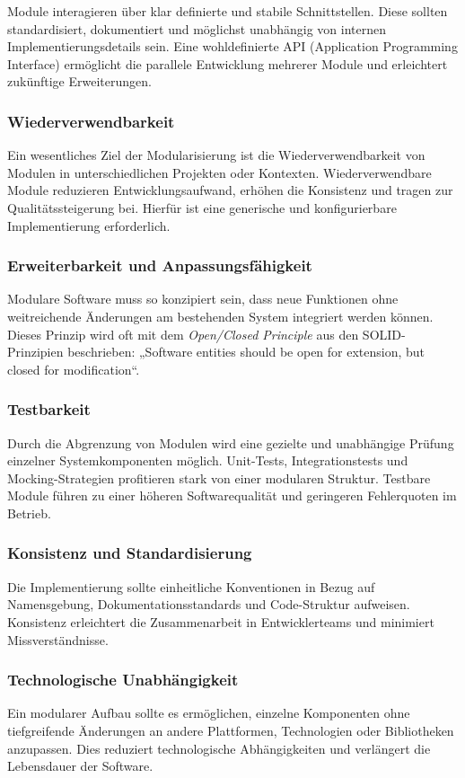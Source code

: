 Module interagieren über klar definierte und stabile Schnittstellen.
Diese sollten standardisiert, dokumentiert und möglichst unabhängig von internen Implementierungsdetails sein.
Eine wohldefinierte API (Application Programming Interface) ermöglicht die parallele Entwicklung mehrerer Module und erleichtert zukünftige Erweiterungen.


\subsubsection{Wiederverwendbarkeit}

Ein wesentliches Ziel der Modularisierung ist die Wiederverwendbarkeit von Modulen in unterschiedlichen Projekten oder Kontexten.
Wiederverwendbare Module reduzieren Entwicklungsaufwand, erhöhen die Konsistenz und tragen zur Qualitätssteigerung bei.
Hierfür ist eine generische und konfigurierbare Implementierung erforderlich.


\subsubsection{Erweiterbarkeit und Anpassungsfähigkeit}

Modulare Software muss so konzipiert sein, dass neue Funktionen ohne weitreichende Änderungen am bestehenden System integriert werden können.
Dieses Prinzip wird oft mit dem \textit{Open/Closed Principle} aus den SOLID-Prinzipien beschrieben: „Software entities should be open for extension, but closed for modification“.


\subsubsection{Testbarkeit}

Durch die Abgrenzung von Modulen wird eine gezielte und unabhängige Prüfung einzelner Systemkomponenten möglich.
Unit-Tests, Integrationstests und Mocking-Strategien profitieren stark von einer modularen Struktur.
Testbare Module führen zu einer höheren Softwarequalität und geringeren Fehlerquoten im Betrieb.


\subsubsection{Konsistenz und Standardisierung}

Die Implementierung sollte einheitliche Konventionen in Bezug auf Namensgebung, Dokumentationsstandards und Code-Struktur aufweisen.
Konsistenz erleichtert die Zusammenarbeit in Entwicklerteams und minimiert Missverständnisse.


\subsubsection{Technologische Unabhängigkeit}

Ein modularer Aufbau sollte es ermöglichen, einzelne Komponenten ohne tiefgreifende Änderungen an andere Plattformen, Technologien oder Bibliotheken anzupassen.
Dies reduziert technologische Abhängigkeiten und verlängert die Lebensdauer der Software.

\pagebreak